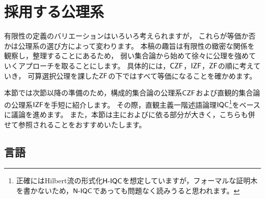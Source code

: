 \section{採用する公理系}
有限性の定義のバリエーションはいろいろ考えられますが，
これらが等価か否かは公理系の選び方によって変わります。
本稿の趣旨は有限性の緻密な関係を観察し，整理することにあるため，
弱い集合論から始めて徐々に公理を強めていくアプローチを取ることにします。
具体的には，\(\CZF\)，\(\IZF\)，\(\ZF\)の順に考えていき，
可算選択公理を課した\(\ZF\)の下ではすべて等価になることを確かめます。

本節では次節以降の準備のため，構成的集合論の公理系\(\CZF\)および直観的集合論の公理系\(\IZF\)を手短に紹介します。
その際，直観主義一階述語論理\(\IQC\)\footnote{正確にはHilbert流の形式化\(\HIQC\)を想定していますが，フォーマルな証明木を書かないため，\(\NIQC\)であっても問題なく読みうると思われます。}をベースに議論を進めます。
また，本節は主に\cite{sep:set_theory__constructive_an_intuitionistic_zf}および\cite{sep:axiom_of_czf_and_izf}に依る部分が大きく，こちらも併せて参照されることをおすすめいたします。

\subsection{言語}
